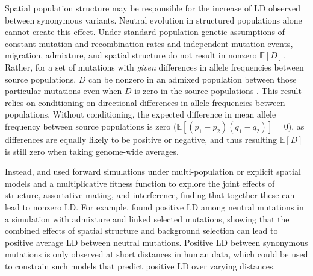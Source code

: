 \documentclass[]{article}
\newcommand{\E}{\mathbb{E}}
\begin{document}
Spatial population structure may be responsible for the increase of LD observed
between synonymous variants. Neutral evolution in structured populations alone
cannot create this effect. Under standard population genetic assumptions of
constant mutation and recombination rates and independent mutation events,
migration, admixture, and spatial structure do not result in nonzero \(\E[D]\).
Rather, for a set of mutations with \emph{given} differences in allele
frequencies between source populations, \(D\) can be nonzero in an admixed
population between those particular mutations even when \(D\) is zero in the
source populations \citep{Cavalli-Sforza1971-jv}. This result relies on
conditioning on directional differences in allele frequencies between
populations. Without conditioning, the expected difference in mean allele
frequency between source populations is zero (\(\E[(p_1-p_2)(q_1-q_2)] = 0\)),
as differences are equally likely to be positive or negative, and thus
resulting \(\E[D]\) is still zero when taking genome-wide averages.

Instead, \citet{Sohail2017-zq} and \citet{Sandler2021-of} used forward
simulations under multi-population or explicit spatial models and a
multiplicative fitness function to explore the joint effects of structure,
assortative mating, and interference, finding that together these can lead to
nonzero LD. For example, \citet{Sandler2021-of} found positive LD among neutral
mutations in a simulation with admixture and linked selected mutations, showing
that the combined effects of spatial structure and background selection can
lead to positive average LD between neutral mutations. Positive LD between
synonymous mutations is only observed at short distances in human data, which
could be used to constrain such models that predict positive LD over varying
distances.
\end{document}
